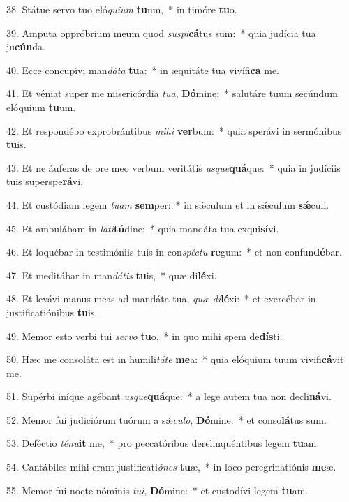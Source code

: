 38. Státue servo tuo eló\textit{qui}\textit{um} \textbf{tu}um,~*  in timóre \textbf{tu}o.\

39. Amputa oppróbrium meum quod \textit{su}\textit{spi}\textbf{cá}tus sum:~*  quia judícia tua ju\textbf{cún}da.\

40. Ecce concupívi man\textit{dá}\textit{ta} \textbf{tu}a:~*  in æquitáte tua vivífi\textbf{ca} me.\

41. Et véniat super me misericórdia \textit{tu}\textit{a}, \textbf{Dó}mine:~*  salutáre tuum secúndum elóquium \textbf{tu}um.\

42. Et respondébo exprobrántibus \textit{mi}\textit{hi} \textbf{ver}bum:~*  quia sperávi in sermónibus \textbf{tu}is.\

43. Et ne áuferas de ore meo verbum veritátis \textit{us}\textit{que}\textbf{quá}que:~*  quia in judíciis tuis superspe\textbf{rá}vi.\

44. Et custódiam legem \textit{tu}\textit{am} \textbf{sem}per:~*  in sǽculum et in sǽculum \textbf{sǽ}culi.\

45. Et ambulábam in \textit{la}\textit{ti}\textbf{tú}dine:~*  quia mandáta tua exqui\textbf{sí}vi.\

46. Et loquébar in testimóniis tuis in con\textit{spéc}\textit{tu} \textbf{re}gum:~*  et non confun\textbf{dé}bar.\

47. Et meditábar in man\textit{dá}\textit{tis} \textbf{tu}is,~*  quæ di\textbf{lé}xi.\

48. Et levávi manus meas ad mandáta tua, \textit{quæ} \textit{di}\textbf{lé}xi:~*  et exercébar in justificatiónibus \textbf{tu}is.\

49. Memor esto verbi tui \textit{ser}\textit{vo} \textbf{tu}o,~*  in quo mihi spem de\textbf{dís}ti.\

50. Hæc me consoláta est in humili\textit{tá}\textit{te} \textbf{me}a:~*  quia elóquium tuum vivifi\textbf{cá}vit me.\

51. Supérbi iníque agébant \textit{us}\textit{que}\textbf{quá}que:~*  a lege autem tua non decli\textbf{ná}vi.\

52. Memor fui judiciórum tuórum a sǽ\textit{cu}\textit{lo}, \textbf{Dó}mine:~*  et conso\textbf{lá}tus sum.\

53. Deféctio \textit{té}\textit{nu}\textbf{it} me,~*  pro peccatóribus derelinquéntibus legem \textbf{tu}am.\

54. Cantábiles mihi erant justificati\textit{ó}\textit{nes} \textbf{tu}æ,~*  in loco peregrinatiónis \textbf{me}æ.\

55. Memor fui nocte nóminis \textit{tu}\textit{i}, \textbf{Dó}mine:~*  et custodívi legem \textbf{tu}am.\

